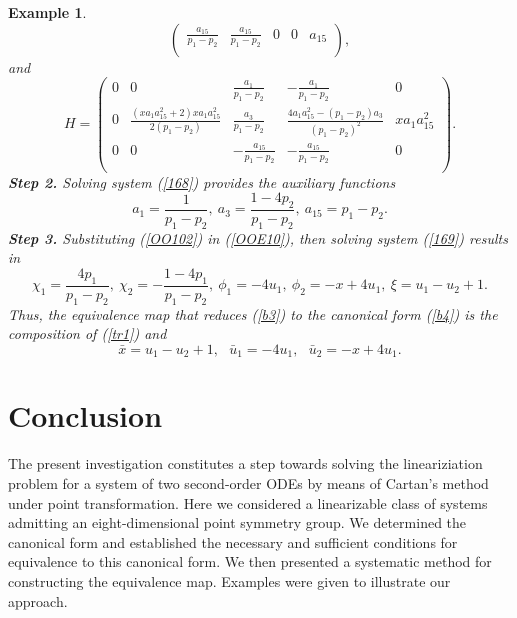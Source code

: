\documentclass[12pt]{article}
\newtheorem{example}[theorem]{Example}
\begin{document}
\begin{example}
\begin{equation}
\begin{pmatrix}
\frac{a_{15}}{p_1-p_2}&\frac{a_{15}}{p_1-p_2}&0&0&a_{15}\\
\end{pmatrix},
\end{equation}
and\begin{equation}\label{OOs3-13}
H=\begin{pmatrix}
0&0&\frac{a_{1}}{p_1-p_2}&-\frac{a_{1}}{p_1-p_2}&0\\
0&\frac{(xa_1a_{15}^2+2)xa_1a^2_{15}}{2(p_1-p_2)}&\frac{a_3}{p_1-p_2}&\frac{4a_1a^2_{15}-(p_1-p_2)a_3}{(p_1-p_2)^2}&xa_1a_{15}^2\\
0&0&-\frac{a_{15}}{p_1-p_2}&-\frac{a_{15}}{p_1-p_2}&0\\
\end{pmatrix}.
\end{equation}
\textbf{Step 2.} Solving system (\ref{168}) provides the auxiliary functions  
\begin{equation}\label{OO102}
a_1=\frac{1}{p_1-p_2},~ a_3=\frac{1-4p_2}{p_1-p_2},~a_{15}=p_1-p_2.
\end{equation}
\textbf{Step 3.} Substituting (\ref{OO102}) in  (\ref{OOE10}), then solving system (\ref{169}) results in  
$$\chi_1=\frac{4p_1}{p_1-p_2}, ~\chi_2=-\frac{1-4p_1}{p_1-p_2}, ~ \phi_1=-4u_1, ~\phi_2=-x+4u_1,~\xi=u_1-u_2+1.$$
 Thus, the equivalence map that reduces (\ref{b3}) to the canonical form (\ref{b4}) is the composition of (\ref{tr1}) and 
\begin{equation}\label{O87}
\bar{x}=u_1-u_2+1, ~~~\bar{u}_1=-4u_1,~~~\bar{u}_2=-x+4u_1.
\end{equation}
\end{example}




\section{Conclusion}
The present investigation constitutes a step towards solving the lineariziation problem for a system of two second-order ODEs by means of Cartan's method under point transformation. Here we considered a linearizable class of systems admitting an eight-dimensional point symmetry group. We determined the canonical form and established the necessary and sufficient conditions for equivalence to this canonical form. We then presented a systematic method for constructing the equivalence map.
Examples were given to illustrate our approach.
\end{document}
